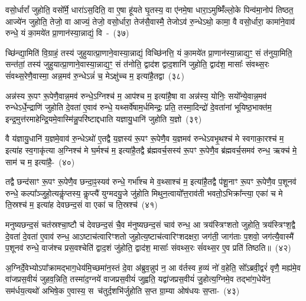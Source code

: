 {\anuvakamend[{अग्ने॒ प्रेह्यव॑ स्म दुहे॒ तां प्र॒जा\-प॑तेः सा॒क्षान्म॑नुष्यवि॒शमेक॑विꣳशतिश्च}]}

वसो॒र्धारां᳚ जुहोति॒ वसो᳚र्मे॒ धारा॑\-ऽस॒दिति॒ वा ए॒षा हू॑यते घृ॒तस्य॒ वा ए॑नमे॒षा धारा॒\-ऽमुष्मिँ॑ल्लो॒के पिन्व॑मा॒नोप॑ तिष्ठत॒ आज्ये॑न जुहोति॒ तेजो॒ वा आज्यं॒ तेजो॒ वसो॒र्धारा॒ तेज॑सै॒वास्मै॒ तेजो\-ऽव॑ रु॒न्धे\-ऽथो॒ कामा॒ वै वसो॒र्धारा॒ कामा॑ने॒वाव॑ रुन्धे॒ यं का॒मये॑त प्रा॒णान॑स्या॒न्नाद्यं॒ वि~-~(३७)\ip

च्छि॑न्द्या॒मिति॑ वि॒ग्राहं॒ तस्य॑ जुहुयात्प्रा॒णाने॒वास्या॒न्नाद्यं॒ विच्छि॑नत्ति॒ यं का॒मये॑त प्रा॒णान॑स्या॒न्नाद्य॒ꣳ॒ सं त॑नुया॒मिति॒ सन्त॑तां॒ तस्य॑ जुहुयात्प्रा॒णाने॒वास्या॒न्नाद्य॒ꣳ॒ सं त॑नोति॒ द्वाद॑श द्वाद॒शानि॑ जुहोति॒ द्वाद॑श॒ मासाः᳚ संवथ्स॒रः सं॑वथ्स॒रेणै॒वास्मा॒ अन्न॒मव॑ रु॒न्धे\-ऽन्नं॑ च॒ मे\-ऽक्षु॑च्च म॒ इत्या॑है॒तद्वा~(३८)\ip

अन्न॑स्य रू॒पꣳ रू॒पेणै॒वान्न॒मव॑ रुन्धे॒\-ऽग्निश्च॑ म॒ आप॑श्च म॒ इत्या॑है॒षा वा अन्न॑स्य॒ योनिः॒ सयो᳚न्ये॒वान्न॒मव॑ रुन्धे\-ऽर्धे॒न्द्राणि॑ जुहोति दे॒वता॑ ए॒वाव॑ रुन्धे॒ यथ्सर्वे॑षाम॒र्धमिन्द्रः॒ प्रति॒ तस्मा॒दिन्द्रो॑ दे॒वता॑नां भूयिष्ठ॒भाक्त॑म॒ इन्द्र॒मुत्त॑रमाहेन्द्रि॒यमे॒वास्मि॑न्नु॒परि॑ष्टाद्दधाति यज्ञायु॒धानि॑ जुहोति य॒ज्ञो~(३९)\ip

वै य॑ज्ञायु॒धानि॑ य॒ज्ञमे॒वाव॑ रु॒न्धे\-ऽथो॑ ए॒तद्वै य॒ज्ञस्य॑ रू॒पꣳ रू॒पेणै॒व य॒ज्ञमव॑ रुन्धे\-ऽवभृ॒थश्च॑ मे स्वगाका॒रश्च॑ म॒ इत्या॑ह स्व॒गाकृ॑त्या अ॒ग्निश्च॑ मे घ॒र्मश्च॑ म॒ इत्या॑है॒तद्वै ब्र॑ह्मवर्च॒सस्य॑ रू॒पꣳ रू॒पेणै॒व ब्र॑ह्मवर्च॒समव॑ रुन्ध॒ ऋक्च॑ मे॒ साम॑ च म॒ इत्या॑है॒-~(४०)\ip

तद्वै छन्द॑साꣳ रू॒पꣳ रू॒पेणै॒व छन्दा॒ꣴ॒स्यव॑ रुन्धे॒ गर्भा᳚श्च मे व॒थ्साश्च॑ म॒ इत्या॑है॒तद्वै प॑शू॒नाꣳ रू॒पꣳ रू॒पेणै॒व प॒शूनव॑ रुन्धे॒ कल्पा᳚ञ्जुहो॒त्यकॢ॑प्तस्य॒ कॢप्त्यै॑ युग्मदयु॒जे जु॑होति मिथुन॒त्वायो᳚त्त॒राव॑ती भवतो॒\-ऽभिक्रा᳚न्त्या॒ एका॑ च मे ति॒स्रश्च॑ म॒ इत्या॑ह देवछन्द॒सं वा एका॑ च ति॒स्रश्च॑~(४१)\ip

मनुष्यछन्द॒सं चत॑स्रश्चा॒ष्टौ च॑ देवछन्द॒सं चै॒व म॑नुष्यछन्द॒सं चाव॑ रुन्ध॒ आ त्रय॑स्त्रिꣳशतो जुहोति॒ त्रय॑स्त्रिꣳश॒द्वै दे॒वता॑ दे॒वता॑ ए॒वाव॑ रुन्ध॒ आऽष्टाच॑त्वारिꣳशतो जुहोत्य॒ष्टाच॑त्वारिꣳशद\-क्षरा॒ जग॑ती॒ जाग॑ताः प॒शवो॒ जग॑त्यै॒वास्मै॑ प॒शूनव॑ रुन्धे॒ वाज॑श्च प्रस॒वश्चेति॑ द्वाद॒शं जु॑होति॒ द्वाद॑श॒ मासाः᳚ संवथ्स॒रः सं॑वथ्स॒र ए॒व प्रति॑ तिष्ठति॥~(४२)\ip

{\anuvakamend[{वि वै य॒ज्ञः साम॑ च म॒ इत्या॑ह च ति॒स्रश्चैका॒न्नप॑ञ्चा॒शच्च॑}]}

अ॒ग्निर्दे॒वेभ्यो\-ऽपा᳚क्रामद्भाग॒\-धेय॑मि॒च्छमा॑न॒स्तं दे॒वा अ॑ब्रुव॒न्नुप॑ न॒ आ व॑र्तस्व ह॒व्यं नो॑ व॒हेति॒ सो᳚\-ऽब्रवी॒द्वरं॑ वृणै॒ मह्य॑मे॒व वा॑जप्रस॒वीयं॑ जुहव॒न्निति॒ तस्मा॑द॒ग्नये॑ वाजप्रस॒वीयं॑ जुह्वति॒ यद्वा॑जप्रस॒वीयं॑ जु॒होत्य॒ग्निमे॒व तद्भा॑ग॒धेये॑न॒ सम॑र्धय॒त्यथो॑ अभिषे॒क ए॒वास्य॒ स~च॑तुर्द॒शभि॑र्जुहोति स॒प्त ग्रा॒म्या ओष॑धयः स॒प्ता-~(४३)\ip

